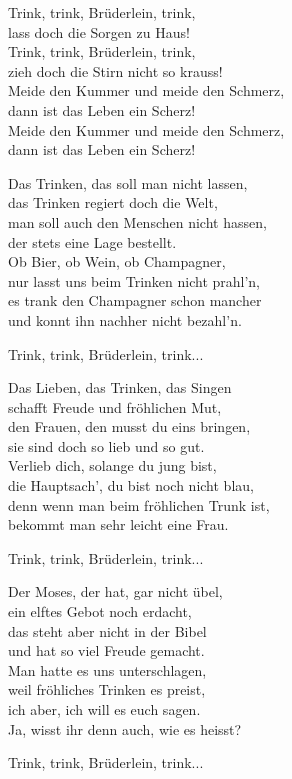 \vspace{10pt}
Trink, trink, Brüderlein, trink,\\
lass doch die Sorgen zu Haus!\\
Trink, trink, Brüderlein, trink,\\
zieh doch die Stirn nicht so krauss!\\
Meide den Kummer und meide den Schmerz,\\
dann ist das Leben ein Scherz!\\
Meide den Kummer und meide den Schmerz,\\
dann ist das Leben ein Scherz!\par
\vspace{10pt}
Das Trinken, das soll man nicht lassen,\\
das Trinken regiert doch die Welt,\\
man soll auch den Menschen nicht hassen,\\
der stets eine Lage bestellt.\\
Ob Bier, ob Wein, ob Champagner,\\
nur lasst uns beim Trinken nicht prahl'n,\\
es trank den Champagner schon mancher\\
und konnt ihn nachher nicht bezahl'n.\par
\vspace{10pt}
Trink, trink, Brüderlein, trink...\par
\vspace{10pt}
Das Lieben, das Trinken, das Singen\\
schafft Freude und fröhlichen Mut,\\
den Frauen, den musst du eins bringen,\\
sie sind doch so lieb und so gut.\\
Verlieb dich, solange du jung bist,\\
die Hauptsach', du bist noch nicht blau,\\
denn wenn man beim fröhlichen Trunk ist,\\
bekommt man sehr leicht eine Frau.\par
\vspace{10pt}
Trink, trink, Brüderlein, trink...\par
\vspace{10pt}
Der Moses, der hat, gar nicht übel,\\
ein elftes Gebot noch erdacht,\\
das steht aber nicht in der Bibel\\
und hat so viel Freude gemacht.\\
Man hatte es uns unterschlagen,\\
weil fröhliches Trinken es preist,\\
ich aber, ich will es euch sagen.\\
Ja, wisst ihr denn auch, wie es heisst?\par
\vspace{10pt}
Trink, trink, Brüderlein, trink...
